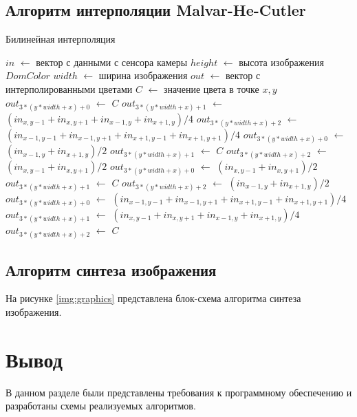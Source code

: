 \subsection{Алгоритм интерполяции Malvar-He-Cutler}
\clearpage
\begin{algorithm}[H]
	\caption{Билинейная интерполяция}
	\label{alg:analchange}
	\begin{algorithmic}[1]
		\State $in$ $\gets$ вектор с данными с сенсора камеры
		\State $height$ $\gets$ высота изображения $DomColor$
		\State $width$ $\gets$ ширина изображения
		\State $out$ $\gets$ вектор с интерполированными цветами
		\State $C$ $\gets$ значение цвета в точке $x,y$
		\State $out_{3 * (y * width + x) + 0}$ $\gets$ $C$
		\State $out_{3 * (y * width + x) + 1}$ $\gets$ $(in_{x, y-1} + in_{x, y + 1} + in_{x - 1, y} + in_{x + 1, y}) / 4$
		\State $out_{3 * (y * width + x) + 2}$ $\gets$ $(in_{x-1, y-1} + in_{x-1, y+1} + in_{x+1, y-1} + in_{x+1, y+1}) / 4$
		\Else
		\State $out_{3 * (y * width + x) + 0}$ $\gets$ $(in_{x-1, y} + in_{x+1, y}) / 2$
		\State $out_{3 * (y * width + x) + 1}$ $\gets$ $C$
		\State $out_{3 * (y * width + x) + 2}$ $\gets$ $(in_{x, y - 1} + in_{x, y+1}) / 2$
		\EndIf
		\Else
		\State $out_{3 * (y * width + x) + 0}$ $\gets$ $(in_{x, y - 1} + in_{x, y+1}) / 2$
		\State $out_{3 * (y * width + x) + 1}$ $\gets$ $C$
		\State $out_{3 * (y * width + x) + 2}$ $\gets$ $(in_{x-1, y} + in_{x+1, y}) / 2$
		\Else
		\State $out_{3 * (y * width + x) + 0}$ $\gets$ $(in_{x-1, y-1} + in_{x-1, y+1} + in_{x+1, y-1} + in_{x+1, y+1}) / 4$
		\State $out_{3 * (y * width + x) + 1}$ $\gets$ $(in_{x, y-1} + in_{x, y + 1} + in_{x - 1, y} + in_{x + 1, y}) / 4$
		\State $out_{3 * (y * width + x) + 2}$ $\gets$ $C$
		\EndIf
		\EndIf
		\EndFor
		\EndFor
	\end{algorithmic}
\end{algorithm}


\clearpage
\subsection{Алгоритм синтеза изображения}

На рисунке \ref{img:graphics} представлена блок-схема алгоритма синтеза изображения.


\section*{Вывод}

В данном разделе были представлены требования к программному обеспечению и разработаны схемы реализуемых алгоритмов.


